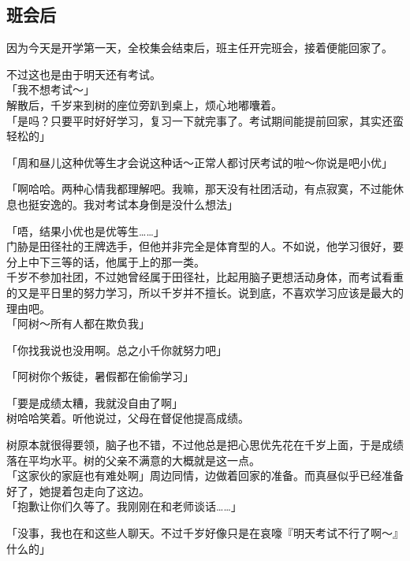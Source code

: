 \subsection{班会后}

因为今天是开学第一天，全校集会结束后，班主任开完班会，接着便能回家了。

不过这也是由于明天还有考试。\\

「我不想考试～」\\

解散后，千岁来到树的座位旁趴到桌上，烦心地嘟囔着。\\

「是吗？只要平时好好学习，复习一下就完事了。考试期间能提前回家，其实还蛮轻松的」

「周和昼儿这种优等生才会说这种话～正常人都讨厌考试的啦～你说是吧小优」

「啊哈哈。两种心情我都理解吧。我嘛，那天没有社团活动，有点寂寞，不过能休息也挺安逸的。我对考试本身倒是没什么想法」

「唔，结果小优也是优等生……」\\

门胁是田径社的王牌选手，但他并非完全是体育型的人。不如说，他学习很好，要分上中下三等的话，他属于上的那一类。\\

千岁不参加社团，不过她曾经属于田径社，比起用脑子更想活动身体，而考试看重的又是平日里的努力学习，所以千岁并不擅长。说到底，不喜欢学习应该是最大的理由吧。\\

「阿树～所有人都在欺负我」

「你找我说也没用啊。总之小千你就努力吧」

「阿树你个叛徒，暑假都在偷偷学习」

「要是成绩太糟，我就没自由了啊」\\

树哈哈笑着。听他说过，父母在督促他提高成绩。

树原本就很得要领，脑子也不错，不过他总是把心思优先花在千岁上面，于是成绩落在平均水平。树的父亲不满意的大概就是这一点。\\

「这家伙的家庭也有难处啊」周边同情，边做着回家的准备。而真昼似乎已经准备好了，她提着包走向了这边。\\

「抱歉让你们久等了。我刚刚在和老师谈话……」

「没事，我也在和这些人聊天。不过千岁好像只是在哀嚎『明天考试不行了啊～』什么的」

